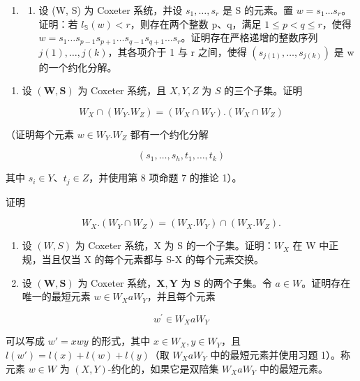 \begin{enumerate}
\def\labelenumi{\arabic{enumi})}
\tightlist
\item
  \begin{enumerate}
  \def\labelenumii{\alph{enumii})}
  \tightlist
  \item
    设 (W, S) 为 Coxeter 系统，并设 \(s_{1}, \ldots, s_{r}\) 是 S 的元素。置 \(w = s_{1} \ldots s_{r}\)。证明：若 \(l_{\mathbb{S}}(w) < r\)，则存在两个整数 p、q，满足 \(1 \leqslant p < q \leqslant r\)，使得 \(w = s_{1} \ldots s_{p-1}s_{p+1} \ldots s_{q-1}s_{q+1} \ldots s_{r}\)。证明存在严格递增的整数序列 \(j(1), \ldots, j(k)\)，其各项介于 1 与 r 之间，使得 \((s_{j(1)}, \ldots, s_{j(k)})\) 是 w 的一个约化分解。
  \end{enumerate}
\end{enumerate}

\begin{enumerate}
\def\labelenumi{\alph{enumi})}
\setcounter{enumi}{1}
\tightlist
\item
  设 \((\mathbf{W},\mathbf{S})\) 为 Coxeter 系统，且 \(X,Y,Z\) 为 \(S\) 的三个子集。证明
\end{enumerate}

\[
W _ {X} \cap (W _ {Y}. W _ {Z}) = (W _ {X} \cap W _ {Y}). (W _ {X} \cap W _ {Z})
\]

（证明每个元素 \(w \in W_{Y}.W_{Z}\) 都有一个约化分解

\[
(s _ {1}, \ldots , s _ {h}, t _ {1}, \ldots , t _ {k})
\]

其中 \(s_i \in Y\)、\(t_j \in Z\)，并使用第 8 项命题 7 的推论 1）。

证明

\[
W _ {X}. \left(W _ {Y} \cap W _ {Z}\right) = \left(W _ {X}. W _ {Y}\right) \cap \left(W _ {X}. W _ {Z}\right).
\]

\begin{enumerate}
\def\labelenumi{\arabic{enumi})}
\setcounter{enumi}{1}
\item
  设 \((W,S)\) 为 Coxeter 系统，X 为 S 的一个子集。证明：\(W_{X}\) 在 W 中正规，当且仅当 X 的每个元素都与 S-X 的每个元素交换。
\item
  设 \((\mathbf{W},\mathbf{S})\) 为 Coxeter 系统，\(\mathbf{X},\mathbf{Y}\) 为 \(\mathbf{S}\) 的两个子集。令 \(a\in W\)。证明存在唯一的最短元素 \(w\in W_X a W_Y\)，并且每个元素
\end{enumerate}

\[
w ^ {\prime} \in W _ {X} a W _ {Y}
\]

可以写成 \(w' = xwy\) 的形式，其中 \(x \in W_X, y \in W_Y\)，且 \(l(w') = l(x) + l(w) + l(y)\)（取 \(W_X aW_Y\) 中的最短元素并使用习题 1）。称元素 \(w \in W\) 为 \((X,Y)\)-约化的，如果它是双陪集 \(W_X aW_Y\) 中的最短元素。

